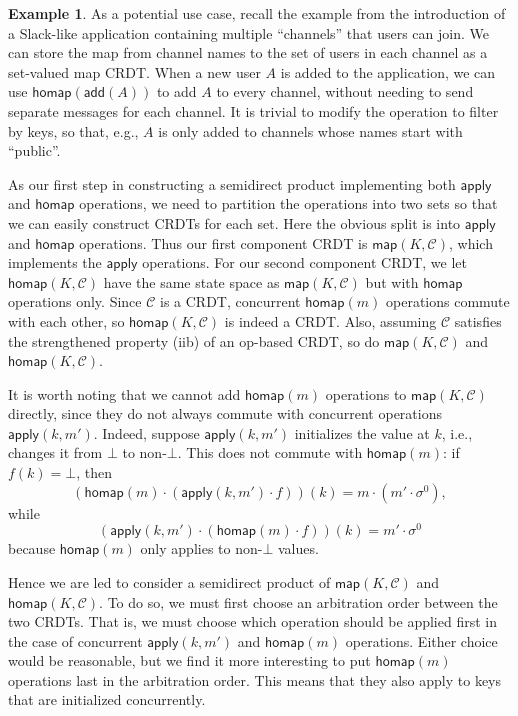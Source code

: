 \documentclass[acmsmall,nonacm]{acmart}
\newcommand{\mc}[1]{\ensuremath{\mathcal{#1}}}
\newcommand{\msf}[1]{\ensuremath{\mathsf{#1}}}
\theoremstyle{plain}
\theoremstyle{definition}
\newtheorem{myex}[mythm]{Example}
\begin{document}
\begin{myex}
As a potential use case, recall the example from the introduction of a Slack-like application containing multiple ``channels'' that users can join.  We can store the map from channel names to the set of users in each channel as a set-valued map CRDT.  When a new user $A$ is added to the application, we can use $\msf{homap}(\msf{add}(A))$ to add $A$ to every channel, without needing to send separate messages for each channel.  It is trivial to modify the operation to filter by keys, so that, e.g., $A$ is only added to channels whose names start with ``public''.
\end{myex}

As our first step in constructing a semidirect product implementing both $\msf{apply}$ and $\msf{homap}$ operations, we need to partition the operations into two sets so that we can easily construct CRDTs for each set.  Here the obvious split is into $\msf{apply}$ and $\msf{homap}$ operations.  Thus our first component CRDT is $\msf{map}(K, \mc{C})$, which implements the $\msf{apply}$ operations.  For our second component CRDT, we let $\msf{homap}(K, \mc{C})$ have the same state space as $\msf{map}(K, \mc{C})$ but with $\msf{homap}$ operations only.  Since $\mc{C}$ is a CRDT, concurrent $\msf{homap}(m)$ operations commute with each other, so $\msf{homap}(K, \mc{C})$ is indeed a CRDT.  Also, assuming $\mc{C}$ satisfies the strengthened property (iib) of an op-based CRDT, so do $\msf{map}(K, \mc{C})$ and $\msf{homap}(K, \mc{C})$.

It is worth noting that we cannot add $\msf{homap}(m)$ operations to $\msf{map}(K, \mc{C})$ directly, since they do not always commute with concurrent operations $\msf{apply}(k, m')$.  Indeed, suppose $\msf{apply}(k, m')$ initializes the value at $k$, i.e., changes it from $\bot$ to non-$\bot$.  This does not commute with $\msf{homap}(m)$: if $f(k) = \bot$, then
\[
\left(\msf{homap}(m) \cdot (\msf{apply}(k, m') \cdot f)\right)(k) = m \cdot (m' \cdot \sigma^0),
\]
while
\[
\left(\msf{apply}(k, m') \cdot (\msf{homap}(m) \cdot f)\right)(k) = m' \cdot \sigma^0
\]
because $\msf{homap}(m)$ only applies to non-$\bot$ values.

Hence we are led to consider a semidirect product of $\msf{map}(K, \mc{C})$ and $\msf{homap}(K, \mc{C})$.  To do so, we must first choose an arbitration order between the two CRDTs.  That is, we must choose which operation should be applied first in the case of concurrent $\msf{apply}(k, m')$ and $\msf{homap}(m)$ operations.  Either choice would be reasonable, but we find it more interesting to put $\msf{homap}(m)$ operations last in the arbitration order.  This means that they also apply to keys that are initialized concurrently.  %
\end{document}
